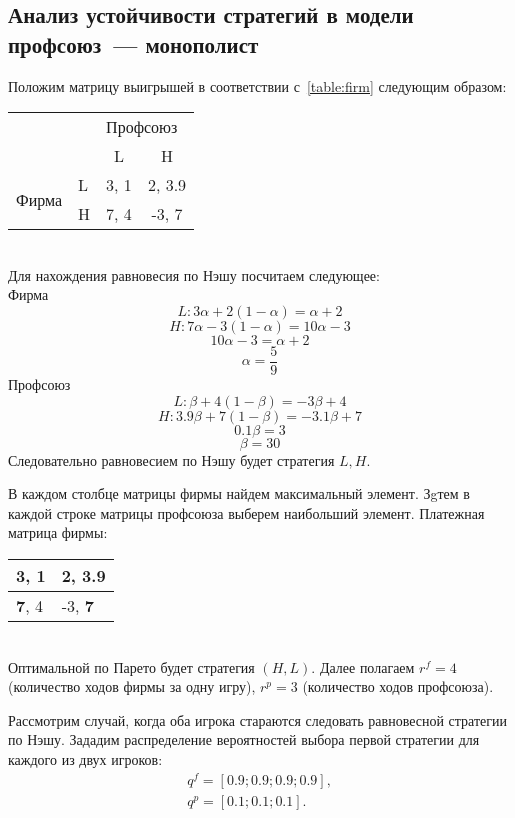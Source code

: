 \subsection{Анализ устойчивости стратегий в модели профсоюз~--- монополист}
Положим матрицу выигрышей в соответствии с~\ref{table:firm} следующим образом:
\begin{table}[h]
	
	\centering
\begin{tabular}{|l|l|c|c|}
	\hline
	\multicolumn{2}{|l|}{\multirow{2}{*}{}} & \multicolumn{2}{l|}{Профсоюз} \\ \cline{3-4} 
	\multicolumn{2}{|l|}{}                  & L            & H              \\ \hline
	\multirow{2}{*}{Фирма}        & L       & 3, 1         & 2, 3.9         \\ \cline{2-4} 
	& H       & 7, 4         & -3, 7          \\ \hline
\end{tabular}
	
\end{table}\\
Для нахождения равновесия по Нэшу посчитаем следующее: \\
Фирма
	$$ L:  3\alpha + 2(1-\alpha)=\alpha + 2$$
	$$ H: 7\alpha - 3(1-\alpha)=10\alpha - 3$$
	$$10\alpha - 3 = \alpha+2 $$
	$$\alpha = \frac{5}{9} $$
Профсоюз	
	 $$L: \beta + 4(1-\beta)=-3\beta + 4$$
	 $$H: 3.9\beta + 7(1-\beta)=-3.1\beta +7$$
	$$0.1\beta  = 3 $$
	$$\beta = 30 $$
Следовательно равновесием по Нэшу будет стратегия $L,H$.

В каждом столбце матрицы фирмы найдем максимальный элемент. 
Зgтем в каждой строке матрицы профсоюза выберем наибольший элемент.
Платежная матрица фирмы:
\begin{table}[h]
	\centering
	\begin{tabular}{|l|l|}
		\hline
		3, 1 & \textbf{2, 3.9}  \\ \hline
		\textbf{7}, 4 & -3, \textbf{7} \\ \hline
	\end{tabular}
\end{table}\\
Оптимальной по Парето будет стратегия $(H,L)$. Далее полагаем $r^f= 4 $ (количество ходов фирмы за одну игру),
$r^p= 3$ (количество ходов профсоюза). 

 Рассмотрим случай, когда оба игрока стараются следовать равновесной стратегии
 по Нэшу.  Зададим распределение вероятностей выбора первой стратегии для
 каждого из двух игроков:
 \begin{gather*}
 	q^f = \left[ 0.9; 0.9; 0.9; 0.9 \right], \\
 	q^p = \left[ 0.1; 0.1; 0.1 \right].
 \end{gather*}

